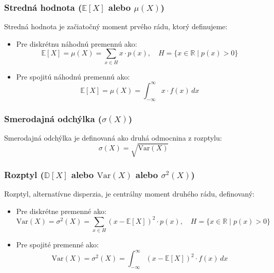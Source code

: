 \subsubsection{Stredná hodnota ($\mathbb{E}[X]$ alebo $\mu(X)$)}

Stredná hodnota je začiatočný moment prvého rádu, ktorý definujeme:

\begin{itemize}
  \item Pre diskrétnu náhodnú premennú ako:
  \begin{equation}
    \mathbb{E}[X] = \mu(X) = \sum_{x \in H} x \cdot p(x), \quad H = \{ x \in \mathbb{R} \mid p(x) > 0 \}
  \end{equation}
  \item Pre spojitú náhodnú premennú ako:
  \begin{equation}
    \mathbb{E}[X] = \mu(X) = \int_{-\infty}^{\infty} x \cdot f(x) \, dx
  \end{equation}
\end{itemize}

\subsubsection{Smerodajná odchýlka ($\sigma(X)$)}

Smerodajná odchýlka je definovaná ako druhá odmocnina z rozptylu:
\begin{equation}
\sigma(X) = \sqrt{\mathrm{Var}(X)}
\end{equation}

\subsubsection{Rozptyl ($\mathbb{D}[X]$ alebo $\mathrm{Var}(X)$ alebo $\sigma^2(X)$)}

Rozptyl, alternatívne disperzia, je centrálny moment druhého rádu, definovaný:

\begin{itemize}
  \item Pre diskrétne premenné ako:
  \begin{equation}
  \mathrm{Var}(X) = \sigma^2(X) = \sum_{x \in H} (x - \mathbb{E}[X])^2 \cdot p(x), \quad H = \{ x \in \mathbb{R} \mid p(x) > 0 \}
  \end{equation}
  \item Pre spojité premenné ako:
  \begin{equation}
  \mathrm{Var}(X) = \sigma^2(X) = \int_{-\infty}^{\infty} (x - \mathbb{E}[X])^2 \cdot f(x) \, dx
  \end{equation}
\end{itemize}

